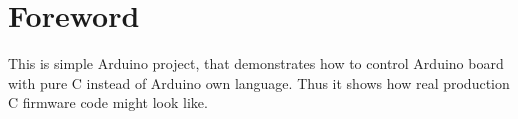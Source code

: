 
\section{Foreword}

This is simple Arduino project, that demonstrates how to control Arduino board with pure C instead of Arduino own language. Thus it shows how real production C firmware code might look like. 